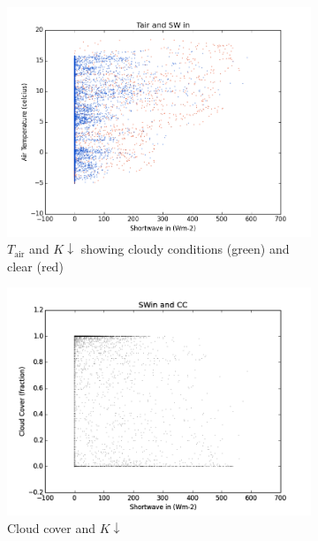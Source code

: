 \documentclass[a4paper,titlepage, twoside]{report}
\newcommand\Kdown{K\!\!\downarrow}
\begin{document}
\begin{figure}
\begin{subfigure}{0.48\textwidth}
\includegraphics[width=\textwidth]{010_SW_Tair_cloud.png}
\caption{$T_\mathrm{air}$ and $\Kdown$ showing cloudy conditions (green) and clear (red)}
\end{subfigure}
\hfill
\begin{subfigure}{0.48\textwidth}
\includegraphics[width=\textwidth]{011_SWin_CC.png}
\caption{Cloud cover and $\Kdown$}
\end{subfigure}
\\
\begin{subfigure}{0.48\textwidth}

\end{subfigure}
\end{figure}
\end{document}
